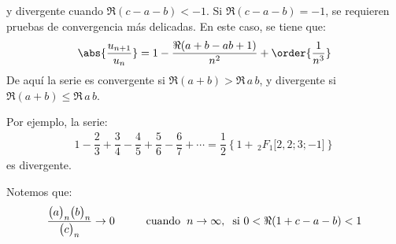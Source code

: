y divergente cuando $\Re (c - a - b) < -1$. Si $\Re (c - a - b) = -1$, se requieren pruebas de convergencia más delicadas. En este caso, se tiene que:
\begin{align}
\abs{\dfrac{u_{n+1}}{u_{n}}} = 1 - \dfrac{\Re (a + b - a b + 1)}{n^{2}} + \order{\dfrac{1}{n^{3}}}
\label{eq:ecuacion_01_01_01_15}
\end{align}
De aquí la serie es convergente si $\Re (a + b) > \Re \, a \, b$, y divergente si \break \hfill $\Re (a + b) \leq \Re \, a \, b$.
\par
Por ejemplo, la serie:
\begin{align}
1 - \dfrac{2}{3} + \dfrac{3}{4} - \dfrac{4}{5} + \dfrac{5}{6} - \dfrac{6}{7} + \cdots = \dfrac{1}{2} \left\{ 1 + \, {}_{2} F_{1} \big[ 2, 2; 3; -1 \big] \right\}
\label{eq:ecuacion_01_01_01_16}
\end{align}
es divergente.
\par
Notemos que:
\begin{align*}
\dfrac{\big( a \big)_{n} \big( b \big)_{n}}{\big( c \big)_{n}} \to 0 \hspace{1cm} \mbox{cuando} \hspace{0.2cm} n \to \infty, \hspace{0.2cm} \mbox{si } 0 < \Re (1 + c - a - b) < 1
\label{eq:ecuacion_01_01_01_17}
\end{align*}
